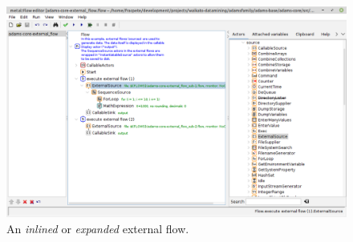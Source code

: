 \begin{figure}[htb]
  \centering
  \includegraphics[width=12.0cm]{images/floweditor-externalactors1_expandedsubflow.png}
  \caption{An \textit{inlined} or \textit{expanded} external flow.}
  \label{floweditor-externalactors1_expandedsubflow}
\end{figure}

\newpage
